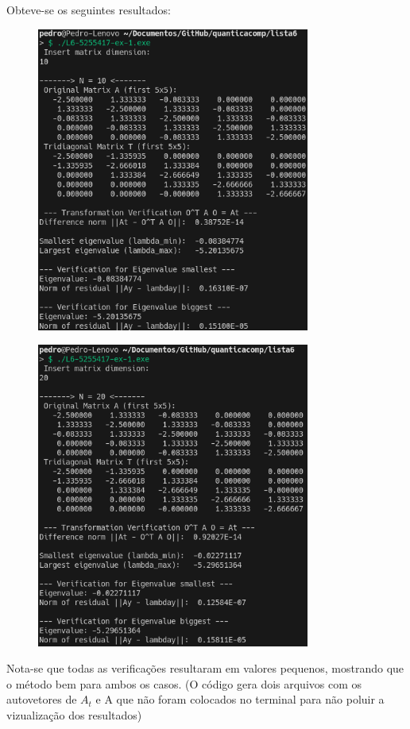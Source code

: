 \documentclass[12pt, a4paper]{article} %
\begin{document}
        Obteve-se os seguintes resultados:
        \begin{figure}[H]
            \centering
            \includegraphics[width=0.8\textwidth]{../images/ex1-10.png}
        \end{figure}
        \begin{figure}[H]
            \centering
            \includegraphics[width=0.8\textwidth]{../images/ex1-20.png}
        \end{figure}

        Nota-se que todas as verifica\c{c}\~oes resultaram em valores pequenos, mostrando que o m\'etodo bem para ambos os casos.
        (O c\'odigo gera dois arquivos com os autovetores de $A_t$ e A que n\~ao foram colocados no terminal para n\~ao poluir a vizualiza\c{c}\~ao dos resultados)
\end{document}
